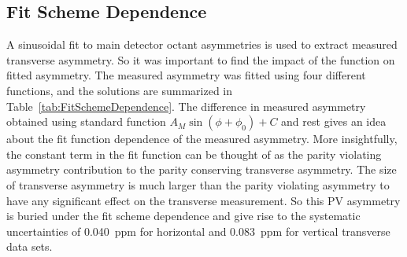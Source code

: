 \subsection{Fit Scheme Dependence}
\label{Fit Scheme Dependence}
A sinusoidal fit to main detector octant asymmetries is used to extract measured transverse asymmetry. So it was important to find the impact of the function on fitted asymmetry.
The measured asymmetry was fitted using four different functions, and the solutions are summarized in Table~\ref{tab:FitSchemeDependence}. 
The difference in measured asymmetry obtained using standard function $A_{M}\sin(\phi+\phi_{0})+C$ and rest gives an idea about the fit function dependence of the measured asymmetry. More insightfully, the constant term in the fit function can be thought of as the parity violating asymmetry contribution to the parity conserving transverse asymmetry. The size of transverse asymmetry is much larger than the parity violating asymmetry to have any significant effect on the transverse measurement. So this PV asymmetry is buried under the fit scheme dependence and give rise to the systematic uncertainties of 0.040~ppm for horizontal and 0.083~ppm for vertical transverse data sets. 

